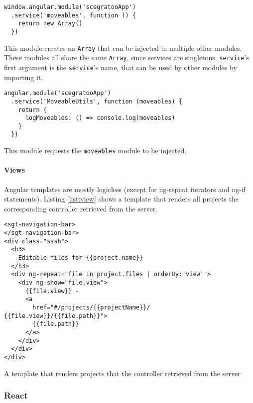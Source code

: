\begin{listing}
  \begin{verbatim}
window.angular.module('scegratooApp')
  .service('moveables', function () {
    return new Array()
  })
  \end{verbatim}
  \caption{This module creates an \texttt{Array} that can be injected in multiple other modules. These modules all share the same \texttt{Array}, since services are singletons. \texttt{service}'s first argument is the \texttt{service}'s name, that can be used by other modules by importing it.}
  \label{list:angularmodule}
\end{listing}

\begin{listing}
  \begin{verbatim}
angular.module('scegratooApp')
  .service('MoveableUtils', function (moveables) {
    return {
      logMoveables: () => console.log(moveables)
    }
  })
  \end{verbatim}
  \caption{This module requests the \texttt{moveables} module to be injected.}
  \label{list:depinj}
\end{listing}

\paragraph{Views}
\label{par:Views}

Angular templates are mostly logicless
(except for ng-repeat iterators and ng-if statements). Listing \ref{list:view}
shows a template that renders all projects the corresponding controller
retrieved from the server.

\begin{listing}
  \begin{verbatim}
<sgt-navigation-bar>
</sgt-navigation-bar>
<div class="sash">
  <h3>
    Editable files for {{project.name}}
  </h3>
  <div ng-repeat="file in project.files | orderBy:'view'">
    <div ng-show="file.view">
      {{file.view}} -
      <a
        href="#/projects/{{projectName}}/ {{file.view}}/{{file.path}}">
        {{file.path}}
      </a>
    </div>
  </div>
</div>
  \end{verbatim}
  \caption{A template that renders projects that the controller retrieved from the server}
  \label{list:view}
\end{listing}

\subsubsection{React}
\label{react}

